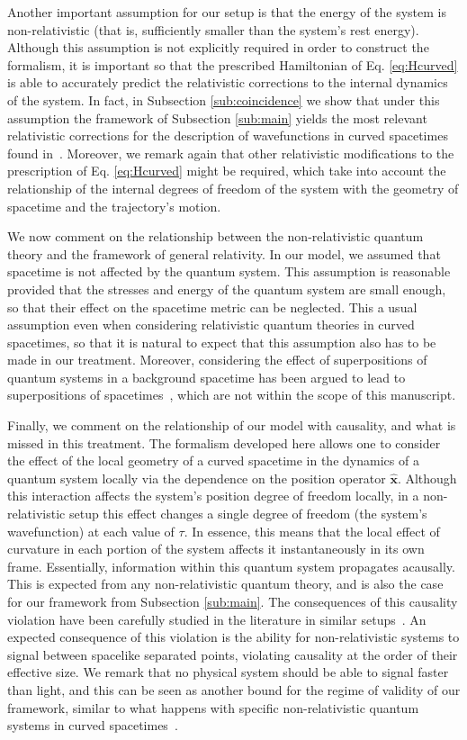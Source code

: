 \documentclass[prd,twocolumn,superscriptaddress,floatfix,amsmath,amssymb,amsfonts,longbibliography,nofootinbib]{revtex4-1}
\newcommand{\tb}[1]{\textcolor{black}{#1}}
\begin{document}
Another important assumption for our setup is that the energy of the system is non-relativistic (that is, sufficiently smaller than the system's rest energy). Although this assumption is not explicitly required in order to construct the formalism, it is important so that the prescribed Hamiltonian of Eq. \eqref{eq:Hcurved} is able to accurately predict the relativistic corrections to the internal dynamics of the system. In fact, in Subsection \ref{sub:coincidence} we show that under this assumption the framework of Subsection \ref{sub:main} yields the most relevant relativistic corrections for the description of wavefunctions in curved spacetimes found in~\cite{jonas}. Moreover, we remark again that other relativistic modifications to the prescription of Eq. \eqref{eq:Hcurved} might be required, which take into account the relationship of the internal degrees of freedom of the system with the geometry of spacetime and the trajectory's motion.

We now comment on the relationship between the non-relativistic quantum theory and the framework of general relativity. In our model, we assumed that spacetime is not affected by the quantum system. This assumption is reasonable provided that the stresses and energy of the quantum system are small enough, so that their effect on the spacetime metric can be neglected. This a usual assumption even when considering relativistic quantum theories in curved spacetimes, so that it is natural to expect that this assumption also has to be made in our treatment. Moreover, considering the effect of superpositions of quantum systems in a background spacetime has been argued to lead to superpositions of spacetimes~\cite{flaminiaSuperpositionSpacetimes2022}, which are not within the scope of this manuscript.

Finally, we comment on the relationship of our model with causality, and what is missed in this treatment. The formalism developed here allows one to consider the effect of the local geometry of a curved spacetime in the dynamics of a quantum system locally via the dependence on the position operator $\hat{\bm x}$. Although this interaction affects the system's position degree of freedom locally, in a non-relativistic setup this effect changes a single degree of freedom (the system's wavefunction) at each value of $\tau$. In essence, this means that the local effect of curvature in each portion of the system affect\tb{s} it instantaneously in its own frame. Essentially, information within this quantum system propagates acausally. This is expected from any non-relativistic quantum theory, and is also the case for our framework from Subsection \ref{sub:main}. The consequences of this causality violation have been carefully studied in the literature in similar setups~\cite{PipoFTL,BrunoDan}. An expected consequence of this violation is the ability for non-relativistic systems to signal between spacelike separated points, violating causality at the order of their effective size. We remark that no physical system should be able to signal faster than light, and this can be seen as another bound for the regime of validity of our framework, similar to what happens with specific non-relativistic quantum systems in curved spacetimes~\cite{us2}.
\end{document}
